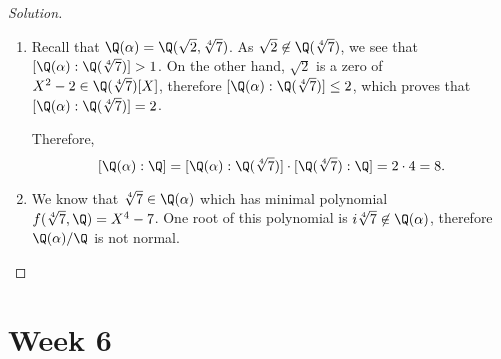 \documentclass[a4paper,10pt,reqno]{amsart}
\newenvironment{sol}
  {\renewcommand\qedsymbol{$\blacksquare$}\begin{proof}[Solution]}
  {\end{proof}}
\begin{document}
\begin{sol}
\begin{enumerate}[label=(\roman*)]
        \item Recall that $\Q(\alpha) = \Q(\sqrt{2},\sqrt[4]{7})$. As $\sqrt{2} \not\in \Q(\sqrt[4]{7})$, we see that $[\Q(\alpha):\Q(\sqrt[4]{7})] > 1$. On the other hand, $\sqrt{2}$ is a zero of $X^2 - 2 \in \Q(\sqrt[4]{7})[X]$, therefore $[\Q(\alpha):\Q(\sqrt[4]{7})] \leq 2$, which proves that $[\Q(\alpha):\Q(\sqrt[4]{7})] = 2$.

        Therefore,
        \[
        [\Q(\alpha):\Q] = [\Q(\alpha):\Q(\sqrt[4]{7})] \cdot [\Q(\sqrt[4]{7}): \Q] = 2 \cdot 4 = 8.
        \]
        \item We know that $\sqrt[4]{7} \in \Q(\alpha)$ which has minimal polynomial $f(\sqrt[4]{7},\Q) = X^4-7$. One root of this polynomial is $i\sqrt[4]{7} \not\in \Q(\alpha)$, therefore $\Q(\alpha)/\Q$ is not normal.\qedhere
    \end{enumerate}
\end{sol}

 \newpage

\section{Week 6}
\end{document}
